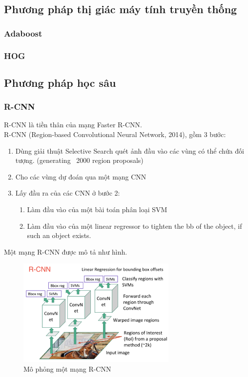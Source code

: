 \documentclass[a4paper]{report}
\begin{document}
\subsection{Phương pháp thị giác máy tính truyền thống}
\subsubsection{Adaboost}
\subsubsection{HOG}

\subsection{Phương pháp học sâu}
\subsubsection{R-CNN}
R-CNN là tiền thân của mạng Faster R-CNN. \\

R-CNN (Region-based Convolutional Neural Network, 2014), gồm 3 bước:
\begin{enumerate}
    \item Dùng giải thuật Selective Search quét ảnh đầu vào các vùng có thể chứa đối tượng. (generating ~2000 region proposals)
    \item Cho các vùng dự đoán qua một mạng CNN
	\item Lấy đầu ra của các CNN ở bước 2:
	\begin{enumerate}
        \item Làm đầu vào của một bài toán phân loại SVM
        \item Làm đầu vào của một linear regressor to tighten the bb of the object, if such an object exists.
	\end{enumerate}
\end{enumerate}

Một mạng R-CNN được mô tả như hình.
\begin{figure}[h!]
	\centering
	\includegraphics[width=0.7\textwidth]{2_rcnn.png}
	\caption{Mô phỏng một mạng R-CNN \cite{detectionoverview}}
	\end{figure}
\end{document}
